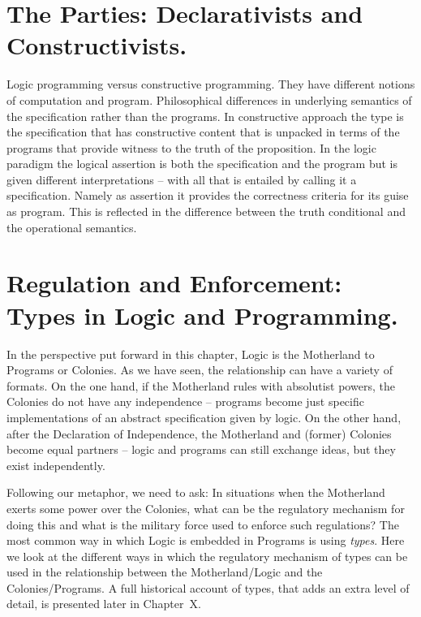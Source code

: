 \documentclass[]{article}
\begin{document}
{\color{red}{this passage does not exist. A student of mine is doing some work in this direction, wonder whether we should explore.}}



\section{The Parties: Declarativists and Constructivists.}


{\color{red}{Ray's}}

Logic programming versus constructive programming. They have different notions of computation and program. Philosophical differences in underlying semantics of the specification rather than the programs. In constructive approach the type is the specification that has constructive content that is unpacked in terms of the programs that provide witness to the truth of the proposition. In the logic paradigm the logical assertion is both the specification and the program but is given different interpretations – with all that is entailed by calling it a specification. Namely as assertion it provides the correctness criteria for its guise as program. This is reflected in the difference between the truth conditional and the operational semantics.



\section{Regulation and Enforcement: Types in Logic and Programming.}


In the perspective put forward in this chapter, Logic is the Motherland to Programs or Colonies. As we have seen, the relationship can have a variety of formats. On the one hand, if the Motherland rules with absolutist powers, the Colonies do not have any independence -- programs become just specific implementations of an abstract specification given by logic. On the other hand, after the Declaration of Independence, the Motherland and (former) Colonies become equal partners -- logic and programs can still exchange ideas, but they exist independently.

Following our metaphor, we need to ask: In situations when the Motherland exerts some power over the Colonies, what can be the regulatory mechanism for doing this and what is the military force used to enforce such regulations? The most common way in which Logic is embedded in Programs is using \emph{types}. Here we look at the different ways in which the regulatory mechanism of types can be used in the relationship between the Motherland/Logic and the Colonies/Programs. A full historical account of types, that adds an extra level of detail, is presented later in Chapter~X.
\end{document}
